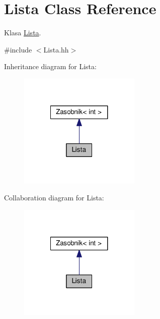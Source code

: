 \hypertarget{a00014}{}\section{Lista Class Reference}
\label{a00014}


Klasa \hyperlink{a00014}{Lista}.  




{\ttfamily \#include $<$Lista.\+hh$>$}



Inheritance diagram for Lista\+:
\nopagebreak
\begin{figure}[H]
\begin{center}
\leavevmode
\includegraphics[width=164pt]{a00154}
\end{center}
\end{figure}


Collaboration diagram for Lista\+:
\nopagebreak
\begin{figure}[H]
\begin{center}
\leavevmode
\includegraphics[width=164pt]{a00155}
\end{center}
\end{figure}
